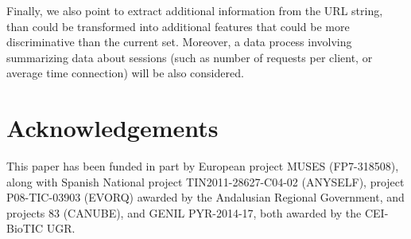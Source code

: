 \documentclass{llncs}
\begin{document}
Finally, we also point to extract additional information from the URL string, than could be transformed into additional features that could be more discriminative than the current set. Moreover, a data process involving summarizing data about sessions (such as number of requests per client, or average time connection) will be also considered.



\section*{Acknowledgements}
This paper has been funded in part by European project MUSES (FP7-318508), along with Spanish National project TIN2011-28627-C04-02 (ANYSELF), project P08-TIC-03903 (EVORQ) awarded by the Andalusian Regional Government, and projects 83 (CANUBE), and GENIL PYR-2014-17, both awarded by the CEI-BioTIC UGR.



\end{document}
